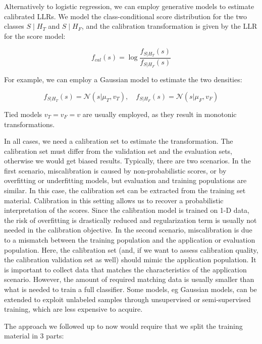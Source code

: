 Alternatively to logistic regression, we can employ generative models to estimate calibrated LLRs. We model the class-conditional score distribution for the two classes $S \mid H_T$ and $S \mid H_F$, and the calibration transformation is given by the LLR for the score model:

\begin{equation*}
f_{cal}(s) = \log \frac{f_{S|H_T}(s)}{f_{S|H_F}(s)}
\end{equation*}

For example, we can employ a Gaussian model to estimate the two densities:

\begin{equation*}
f_{S|H_T}(s) = \mathcal{N}(s|\mu_T, v_T), \quad f_{S|H_F}(s) = \mathcal{N}(s|\mu_F, v_F)
\end{equation*}

Tied models $v_T = v_F = v$ are usually employed, as they result in monotonic transformations.

In all cases, we need a calibration set to estimate the transformation. The calibration set must differ from the validation set and the evaluation sets, otherwise we would get biased results. Typically, there are two scenarios. In the first scenario, miscalibration is caused by non-probabilistic scores, or by overfitting or underfitting models, but evaluation and training populations are similar. In this case, the calibration set can be extracted from the training set material. Calibration in this setting allows us to recover a probabilistic interpretation of the scores. Since the calibration model is trained on 1-D data, the risk of overfitting is drastically reduced and regularization term is usually not needed in the calibration objective. In the second scenario, miscalibration is due to a mismatch between the training population and the application or evaluation population. Here, the calibration set (and, if we want to assess calibration quality, the calibration validation set as well) should mimic the application population. It is important to collect data that matches the characteristics of the application scenario. However, the amount of required matching data is usually smaller than what is needed to train a full classifier. Some models, eg Gaussian models, can be extended to exploit unlabeled samples through unsupervised or semi-supervised training, which are less expensive to acquire.

The approach we followed up to now would require that we split the training material in 3 parts:

